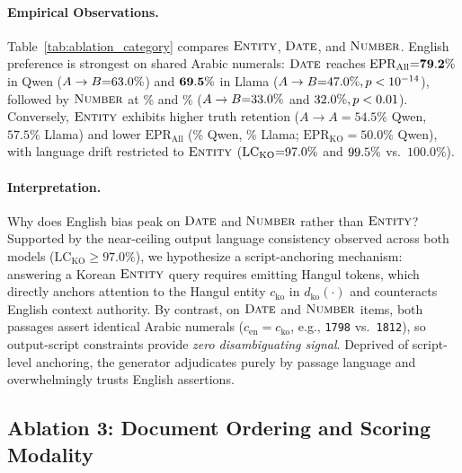 \paragraph{Empirical Observations.}
Table~\ref{tab:ablation_category} compares $\textsc{Entity}$, $\textsc{Date}$, and $\textsc{Number}$. English preference is strongest on shared Arabic numerals: $\textsc{Date}$ reaches $\text{EPR}_{\text{All}}{=}\mathbf{79.2\%}$ in Qwen ($A \to B{=}63.0\%$) and $\mathbf{69.5\%}$ in Llama ($A \to B{=}47.0\%, p < 10^{-14}$), followed by $\textsc{Number}$ at \qwenCatNumberEPRAll\% and \llamaCatNumberEPRAll\% ($A \to B{=}33.0\%$ and $32.0\%, p < 0.01$). Conversely, $\textsc{Entity}$ exhibits higher truth retention ($A \to A{=}54.5\%$ Qwen, $57.5\%$ Llama) and lower $\text{EPR}_{\text{All}}$ (\qwenCatEntityEPRAll\% Qwen, \llamaCatEntityEPRAll\% Llama; $\text{EPR}_{\text{KO}}{=}50.0\%$ Qwen), with language drift restricted to $\textsc{Entity}$ ($\text{LC}_{\text{KO}}{=}97.0\%$ and $99.5\%$ vs.\ $100.0\%$).

\paragraph{Interpretation.}
Why does English bias peak on $\textsc{Date}$ and $\textsc{Number}$ rather than $\textsc{Entity}$? Supported by the near-ceiling output language consistency observed across both models ($\text{LC}_{\text{KO}} \ge 97.0\%$), we hypothesize a script-anchoring mechanism: answering a Korean $\textsc{Entity}$ query requires emitting Hangul tokens, which directly anchors attention to the Hangul entity $c_{\text{ko}}$ in $d_{\text{ko}}(\cdot)$ and counteracts English context authority. By contrast, on $\textsc{Date}$ and $\textsc{Number}$ items, both passages assert identical Arabic numerals ($c_{\text{en}}{=}c_{\text{ko}}$, e.g., \texttt{1798} vs.\ \texttt{1812}), so output-script constraints provide \emph{zero disambiguating signal}. Deprived of script-level anchoring, the generator adjudicates purely by passage language and overwhelmingly trusts English assertions.

\subsection{Ablation 3: Document Ordering and Scoring Modality}
\label{subsec:ablation_order}

